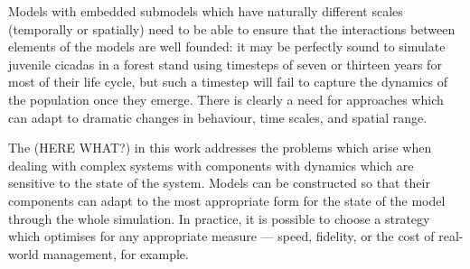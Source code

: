 Models with embedded submodels which have naturally different scales
(temporally or spatially) need to be able to ensure that the
interactions between elements of the models are well founded: it may
be perfectly sound to simulate juvenile cicadas in a forest stand
using timesteps of seven or thirteen years for most of their life
cycle, but such a timestep will fail to capture the dynamics of the
population once they emerge.  There is clearly a need for approaches
which can adapt to dramatic changes in behaviour, time scales, and
spatial range.




The (HERE WHAT?) in this work addresses the problems which arise when dealing
with complex systems with components with dynamics which are sensitive
to the state of the system.  Models can be constructed so that their
components can adapt to the most appropriate form for the state of the
model through the whole simulation. In practice, it is possible to
choose a strategy which optimises for any appropriate measure ---
speed, fidelity, or the cost of real-world management, for example.

